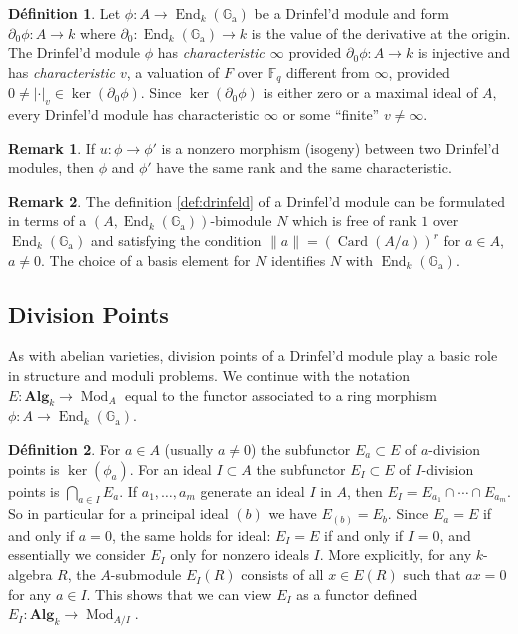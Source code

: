 \documentclass[12pt,a4paper]{article}
\theoremstyle{plain}
\theoremstyle{definition}
\newtheorem{definition}{D\'efinition}[section]
\newtheorem{remark}{Remark}[section]
\theoremstyle{remark}
\DeclareMathOperator{\End}{End}
\DeclareMathOperator{\Card}{Card}
\DeclareMathOperator{\Mod}{Mod}
\newcommand{\bF}{\mathbb{F}}
\newcommand{\Ga}{\mathbb{G}_\mathrm{a}}
\providecommand{\Ga}{\mathbb{G}_{\mathrm a}}
\providecommand{\End}{\operatorname{End}}
\providecommand{\Alg}{\mathbf{Alg}}
\begin{document}
\begin{definition}
\label{def:characteristic}
Let $\phi: A \to \End_k(\Ga)$ be a Drinfel'd module and form $\partial_0 \phi: A \to k$ where $\partial_0: \End_k(\Ga) \to k$ is the value of the derivative at the origin. The Drinfel'd module $\phi$ has \emph{characteristic $\infty$} provided $\partial_0 \phi: A \to k$ is injective and has \emph{characteristic $v$}, a valuation of $F$ over $\bF_q$ different from $\infty$, provided $0 \neq |\cdot|_v \in \ker(\partial_0 \phi)$. Since $\ker(\partial_0 \phi)$ is either zero or a maximal ideal of $A$, every Drinfel'd module has characteristic $\infty$ or some ``finite'' $v \neq \infty$.
\end{definition}

\begin{remark}
\label{rem:samerank}
If $u: \phi \to \phi'$ is a nonzero morphism (isogeny) between two Drinfel'd modules, then $\phi$ and $\phi'$ have the same rank and the same characteristic.
\end{remark}

\begin{remark}
\label{rem:bimodule}
The definition \eqref{def:drinfeld} of a Drinfel'd module can be formulated in terms of a $(A, \End_k(\Ga))$-bimodule $N$ which is free of rank $1$ over $\End_k(\Ga)$ and satisfying the condition $\|a\| = (\Card(A/a))^r$ for $a \in A$, $a \neq 0$. The choice of a basis element for $N$ identifies $N$ with $\End_k(\Ga)$.
\end{remark}

\subsection{Division Points}
\label{sec:division}

As with abelian varieties, division points of a Drinfel'd module play a basic role in structure and moduli problems. We continue with the notation $E: \Alg_k \to \Mod_A$ equal to the functor associated to a ring morphism $\phi: A \to \End_k(\Ga)$.

\begin{definition}
\label{def:division}
For $a \in A$ (usually $a \neq 0$) the subfunctor $E_a \subset E$ of $a$-division points is $\ker(\phi_a)$. For an ideal $I \subset A$ the subfunctor $E_I \subset E$ of $I$-division points is $\bigcap_{a \in I} E_a$. If $a_1, \ldots, a_m$ generate an ideal $I$ in $A$, then $E_I = E_{a_1} \cap \cdots \cap E_{a_m}$. So in particular for a principal ideal $(b)$ we have $E_{(b)} = E_b$. Since $E_a = E$ if and only if $a = 0$, the same holds for ideal: $E_I = E$ if and only if $I = 0$, and essentially we consider $E_I$ only for nonzero ideals $I$. More explicitly, for any $k$-algebra $R$, the $A$-submodule $E_I(R)$ consists of all $x \in E(R)$ such that $ax = 0$ for any $a \in I$. This shows that we can view $E_I$ as a functor defined $E_I: \Alg_k \to \Mod_{A/I}$.
\end{definition}
\end{document}
